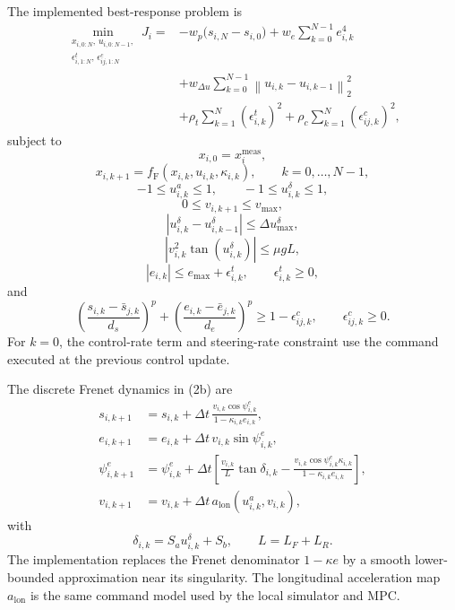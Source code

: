 \documentclass[11pt]{article}
\begin{document}
The implemented best-response problem is
\[
\begin{aligned}
\min_{\substack{x_{i,0:N},\,u_{i,0:N-1},\\
                \epsilon^t_{i,1:N},\,\epsilon^c_{ij,1:N}}}
J_i
={}&
-w_p\bigl(s_{i,N}-s_{i,0}\bigr)
+w_e\sum_{k=0}^{N-1} e_{i,k}^{4} \\
&+w_{\Delta u}\sum_{k=0}^{N-1}
  \left\|u_{i,k}-u_{i,k-1}\right\|_2^2 \\
&+\rho_t\sum_{k=1}^{N}\left(\epsilon^t_{i,k}\right)^2
+\rho_c\sum_{k=1}^{N}\left(\epsilon^c_{ij,k}\right)^2 ,
\end{aligned}
\tag{1}
\]
subject to
\[
  x_{i,0}=x_i^{\mathrm{meas}},
\tag{2a}
\]
\[
  x_{i,k+1}=f_{\mathrm{F}}(x_{i,k},u_{i,k},\kappa_{i,k}),
  \qquad k=0,\ldots,N-1,
\tag{2b}
\]
\[
  -1\leq u_{i,k}^{a}\leq 1,
  \qquad
  -1\leq u_{i,k}^{\delta}\leq 1,
\tag{2c}
\]
\[
  0\leq v_{i,k+1}\leq v_{\max},
\tag{2d}
\]
\[
  \left|u_{i,k}^{\delta}-u_{i,k-1}^{\delta}\right|
  \leq \Delta u_{\max}^{\delta},
\tag{2e}
\]
\[
  \left|v_{i,k}^{2}\tan\!\left(u_{i,k}^{\delta}\right)\right|
  \leq \mu g L,
\tag{2f}
\]
\[
  |e_{i,k}|\leq e_{\max}+\epsilon^t_{i,k},
  \qquad
  \epsilon^t_{i,k}\geq0,
\tag{2g}
\]
and
\[
  \left(
    \frac{s_{i,k}-\bar s_{j,k}}{d_s}
  \right)^{p}
  +
  \left(
    \frac{e_{i,k}-\bar e_{j,k}}{d_e}
  \right)^{p}
  \geq
  1-\epsilon^c_{ij,k},
  \qquad
  \epsilon^c_{ij,k}\geq0.
\tag{2h}
\]
For $k=0$, the control-rate term and steering-rate constraint use the command
executed at the previous control update.

The discrete Frenet dynamics in (2b) are
\[
\begin{aligned}
s_{i,k+1}
&=s_{i,k}
+\Delta t\,
 \frac{v_{i,k}\cos\psi^e_{i,k}}
      {1-\kappa_{i,k}e_{i,k}},\\
e_{i,k+1}
&=e_{i,k}
+\Delta t\,v_{i,k}\sin\psi^e_{i,k},\\
\psi^e_{i,k+1}
&=\psi^e_{i,k}
+\Delta t\left[
  \frac{v_{i,k}}{L}\tan\delta_{i,k}
  -
  \frac{v_{i,k}\cos\psi^e_{i,k}\kappa_{i,k}}
       {1-\kappa_{i,k}e_{i,k}}
\right],\\
v_{i,k+1}
&=v_{i,k}
+\Delta t\,a_{\mathrm{lon}}(u^a_{i,k},v_{i,k}),
\end{aligned}
\tag{3}
\]
with
\[
  \delta_{i,k}=S_a u^\delta_{i,k}+S_b,
  \qquad
  L=L_F+L_R.
\]
The implementation replaces the Frenet denominator
$1-\kappa e$ by a smooth lower-bounded approximation near its singularity.
The longitudinal acceleration map $a_{\mathrm{lon}}$ is the same command model
used by the local simulator and MPC.
\end{document}
